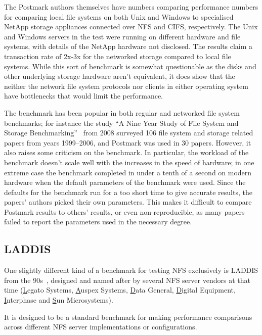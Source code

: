 The Postmark authors themselves have numbers comparing performance numbers for comparing local file systems on both Unix and Windows
to specialised NetApp storage appliances connected over NFS and CIFS, respectively.
The Unix and Windows servers in the test were running on different hardware and file systems,
with details of the NetApp hardware not disclosed.
The results claim a transaction rate of 2x-3x for the networked storage compared to local file systems.
While this sort of benchmark is somewhat questionable as the disks and other underlying storage hardware aren't equivalent,
it does show that the neither the network file system protocols nor clients in either operating system have
bottlenecks that would limit the performance.

The benchmark has been popular in both regular and networked file system benchmarks;
for instance the study ``A Nine Year Study of File System and Storage Benchmarking''~\cite{MetaStudy} from 2008
surveyed 106 file system and storage related papers from years 1999--2006, and Postmark was used in 30 papers.
However, it also raises some criticism on the benchmark.
In particular, the workload of the benchmark doesn't scale well with the increases in the speed of hardware;
in one extreme case the benchmark completed in under a tenth of a second on modern hardware when the default parameters
of the benchmark were used.
Since the defaults for the benchmark run for a too short time to give accurate results,
the papers' authors picked their own parameters.
This makes it difficult to compare Postmark results to others' results,
or even non-reproducible, as many papers failed to report the parameters used in the necessary degree.

\subsection{LADDIS}
One slightly different kind of a benchmark for testing NFS exclusively is LADDIS from the 90s~\cite{LADDIS}, designed and named after by
several NFS server vendors at that time (\underline{L}egato Systems, \underline{A}uspex Systems, \underline{D}ata General,
\underline{D}igital Equipment, \underline{I}nterphase and \underline{S}un Microsystems).

It is designed to be a standard benchmark for making performance comparisons across different NFS server implementations or configurations.

